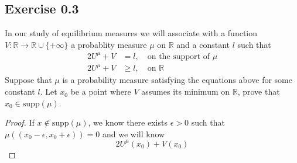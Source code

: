 \documentclass[lang=en,11pt,a4paper,citestyle =authoryear]{elegantpaper}
\newcommand{\R}{\mathbb{R}}
\begin{document}
\subsection*{Exercise 0.3}In our study of equilibrium measures we will associate with a function $V:\R \to \R\cup\{+\infty\}$ a probablity measure $\mu$ on $\R$ and a constant $l$ such that
\[
\begin{aligned}
    2U^{\mu}+V &= l,\quad\text{on the support of }\mu\\
    2U^{\mu}+V&\geq l,\quad\text{on }\R
\end{aligned}
\]
Suppose that $\mu$ is a probability measure satisfying the equations above for some constant $l$. Let $x_0$ be a point where $V$ assumes its minimum on $\R$, prove that $x_0 \in \text{supp}(\mu)$.
\begin{proof}
   If $x\notin \text{supp}(\mu)$, we know there exists $\epsilon >0 $ such that $\mu((x_0-\epsilon,x_0+\epsilon)) = 0$ and we will know
   \[
   2U^{\mu}(x_0) + V(x_0)
   \] 
\end{proof}

\addappheadtotoc
\end{document}
